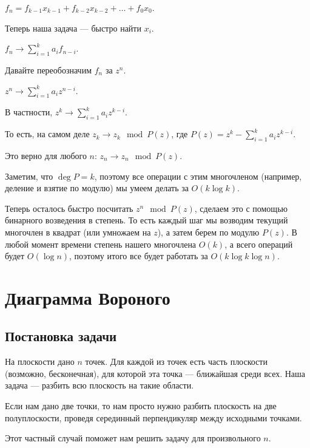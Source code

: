\begin{enumerate}
		$f_n = f_{k-1} x_{k-1} + f_{k-2} x_{k-2} + \dots + f_0 x_0$.

		Теперь наша задача --- быстро найти $x_i$.

		$f_n \rightarrow \sum\limits_{i=1}^k a_i f_{n-i}$.

		Давайте переобозначим $f_n$ за $z^n$.

		$z^n \rightarrow \sum\limits_{i=1}^k a_i z^{n-i}$.

		В частности, $z^k \rightarrow \sum\limits_{i=1}^k a_i z^{k-i}$.

		То есть, на самом деле $z_k \rightarrow z_k \mod P(z)$, где $P(z) = z^k - \sum\limits_{i=1}^k a_i z^{k-i}$.

		Это верно для любого $n$: $z_n \rightarrow z_n \mod P(z)$.                                                                           

		Заметим, что $\deg P = k$, поэтому все операции с этим многочленом (например, деление и взятие по модулю) мы умеем делать за $O(k \log k)$.

		Теперь осталось быстро посчитать $z^n \mod P(z)$, сделаем это с помощью бинарного возведения в степень. 
		То есть каждый шаг мы возводим текущий многочлен в квадрат (или умножаем на $z$), а затем берем по модулю $P(z)$.
		В любой момент времени степень нашего многочлена $O(k)$, а всего операций будет $O(\log n)$, поэтому итого все будет работать за $O(k \log k \log n)$.

\end{enumerate}

\section{Диаграмма Вороного}

\subsection{Постановка задачи}

На плоскости дано $n$ точек. 
Для каждой из точек есть часть плоскости (возможно, бесконечная), для которой эта точка --- ближайшая среди всех. 
Наша задача --- разбить всю плоскость на такие области.

\begin{exmp}
	Если нам дано две точки, то нам просто нужно разбить плоскость на две полуплоскости, проведя серединный перпендикуляр между исходными точками.
\end{exmp}

Этот частный случай поможет нам решить задачу для произвольного $n$.


